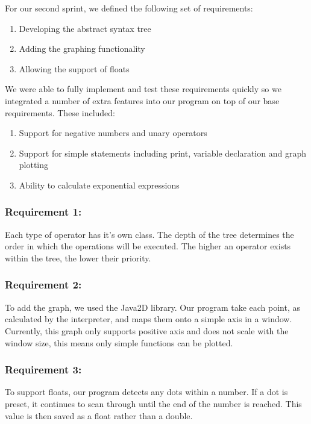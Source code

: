 \documentclass[a4paper, oneside, 11pt]{report}
\begin{document}
For our second sprint, we defined the following set of requirements:

\begin{enumerate}
\item Developing the abstract syntax tree
\item Adding the graphing functionality
\item Allowing the support of floats
\end{enumerate}

We were able to fully implement and test these requirements quickly so we integrated
a number of extra features into our program on top of our base requirements. These
included:
\begin{enumerate}
\item Support for negative numbers and unary operators
\item Support for simple statements including print, variable declaration and graph plotting
\item  Ability to calculate exponential expressions
\end{enumerate}

\subsubsection{Requirement 1: }

Each type of operator has it's own class. The depth of the tree determines the order in which the operations will be executed. The higher an operator exists within the tree, the lower their priority.

\subsubsection {Requirement 2: }

To add the graph, we used the Java2D library. Our program take each point, as calculated by the interpreter, and maps them onto a simple axis in a window. Currently, this graph only supports positive axis and does not scale with the window size, this means only simple functions can be plotted.

\subsubsection {Requirement 3: }

To support floats, our program detects any dots within a number. If a dot is preset, it continues to scan through until the end of the number is reached. This value is then saved as a float rather than a double.
\end{document}
